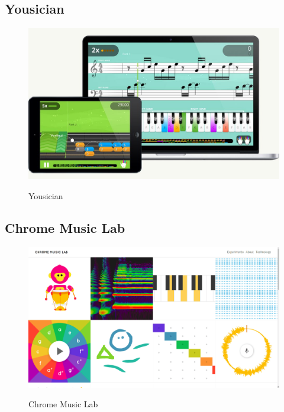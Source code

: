 	\subsection{Yousician}
		\begin{figure}[H]
			\centering
			\includegraphics[width=0.8\linewidth]{figure/Analysis/yousician.jpg}
			\label{fig:yousician}
			\caption{Yousician}
		\end{figure}
	\subsection{Chrome Music Lab}
		\begin{figure}[H]
			\centering
			\includegraphics[width=0.8\linewidth]{figure/Analysis/chromeMusicLab.png}
			\label{fig:chromeMusicLab}
			\caption{Chrome Music Lab}
		\end{figure}

		